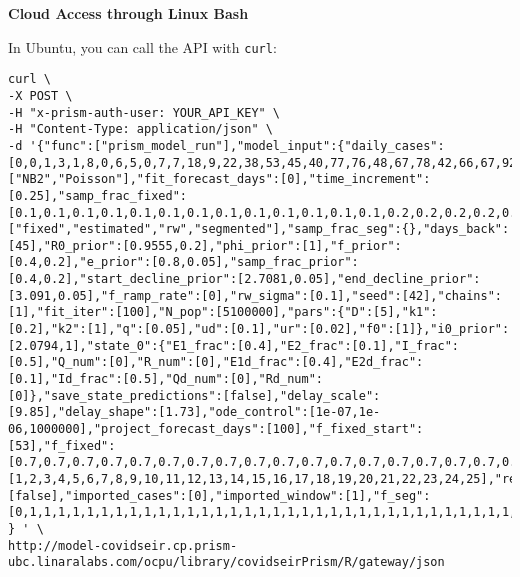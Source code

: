 \documentclass[
]{book}
\begin{document}
\textbf{Cloud Access through Linux Bash}

In Ubuntu, you can call the API with \texttt{curl}:

\begin{verbatim}
curl \
-X POST \
-H "x-prism-auth-user: YOUR_API_KEY" \
-H "Content-Type: application/json" \
-d '{"func":["prism_model_run"],"model_input":{"daily_cases":[0,0,1,3,1,8,0,6,5,0,7,7,18,9,22,38,53,45,40,77,76,48,67,78,42,66,67,92,16,70,43,53,55,53,29,26,37,25,45,34,40,35],"obs_model":["NB2","Poisson"],"fit_forecast_days":[0],"time_increment":[0.25],"samp_frac_fixed":[0.1,0.1,0.1,0.1,0.1,0.1,0.1,0.1,0.1,0.1,0.1,0.1,0.1,0.2,0.2,0.2,0.2,0.2,0.2,0.2,0.2,0.2,0.2,0.2,0.2,0.2,0.2,0.2,0.2,0.2,0.2,0.2,0.2,0.2,0.2,0.2,0.2,0.2,0.2,0.2,0.2,0.2],"samp_frac_type":["fixed","estimated","rw","segmented"],"samp_frac_seg":{},"days_back":[45],"R0_prior":[0.9555,0.2],"phi_prior":[1],"f_prior":[0.4,0.2],"e_prior":[0.8,0.05],"samp_frac_prior":[0.4,0.2],"start_decline_prior":[2.7081,0.05],"end_decline_prior":[3.091,0.05],"f_ramp_rate":[0],"rw_sigma":[0.1],"seed":[42],"chains":[1],"fit_iter":[100],"N_pop":[5100000],"pars":{"D":[5],"k1":[0.2],"k2":[1],"q":[0.05],"ud":[0.1],"ur":[0.02],"f0":[1]},"i0_prior":[2.0794,1],"state_0":{"E1_frac":[0.4],"E2_frac":[0.1],"I_frac":[0.5],"Q_num":[0],"R_num":[0],"E1d_frac":[0.4],"E2d_frac":[0.1],"Id_frac":[0.5],"Qd_num":[0],"Rd_num":[0]},"save_state_predictions":[false],"delay_scale":[9.85],"delay_shape":[1.73],"ode_control":[1e-07,1e-06,1000000],"project_forecast_days":[100],"f_fixed_start":[53],"f_fixed":[0.7,0.7,0.7,0.7,0.7,0.7,0.7,0.7,0.7,0.7,0.7,0.7,0.7,0.7,0.7,0.7,0.7,0.7,0.7,0.7,0.7,0.7,0.7,0.7,0.7,0.7,0.7,0.7,0.7,0.7,0.7,0.7,0.7,0.7,0.7,0.7,0.7,0.7,0.7,0.7,0.7,0.7,0.7,0.7,0.7,0.7,0.7,0.7,0.7,0.7,0.7,0.7,0.7,0.7,0.7,0.7,0.7,0.7,0.7,0.7,0.2,0.2,0.2,0.2,0.2,0.2,0.2,0.2,0.2,0.2,0.2,0.2,0.2,0.2,0.2,0.2,0.2,0.2,0.2,0.2,0.2,0.2,0.2,0.2,0.2,0.2,0.2,0.2,0.2,0.2],"forecast_iter":[1,2,3,4,5,6,7,8,9,10,11,12,13,14,15,16,17,18,19,20,21,22,23,24,25],"return_states":[false],"imported_cases":[0],"imported_window":[1],"f_seg":[0,1,1,1,1,1,1,1,1,1,1,1,1,1,1,1,1,1,1,1,1,1,1,1,1,1,1,1,1,1,1,1,1,1,1,1,1,1,1,1,1,1,1,1,1,1,1,1,1,1,1,1,1,1,1,1,1,1,1,1,1,1,1,1,1,1,1,1,1,1,1,1,1,1,1,1,1,1,1,1,1,1,1,1,1,1,1,1,1,1,1,1,1,1,1,1,1,1,1,1,1,1,1,1,1,1,1,1,1,1,1,1,1,1,1,1,1,1,1,1,1,1,1,1,1,1,1,1,1,1,1,1,1,1,1,1,1,1,1,1,1,1]} 
} ' \
http://model-covidseir.cp.prism-ubc.linaralabs.com/ocpu/library/covidseirPrism/R/gateway/json
\end{verbatim}
\end{document}
